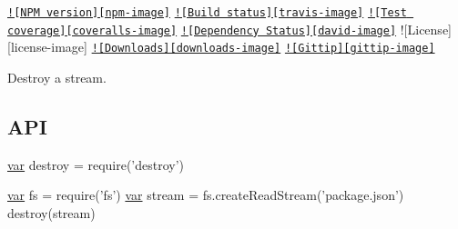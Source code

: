 \href{https://npmjs.org/package/destroy}{\tt !\mbox{[}N\+P\+M version\mbox{]}\mbox{[}npm-\/image\mbox{]}} \href{https://travis-ci.org/stream-utils/destroy}{\tt !\mbox{[}Build status\mbox{]}\mbox{[}travis-\/image\mbox{]}} \href{https://coveralls.io/r/stream-utils/destroy?branch=master}{\tt !\mbox{[}Test coverage\mbox{]}\mbox{[}coveralls-\/image\mbox{]}} \href{https://david-dm.org/stream-utils/destroy}{\tt !\mbox{[}Dependency Status\mbox{]}\mbox{[}david-\/image\mbox{]}} !\mbox{[}License\mbox{]}\mbox{[}license-\/image\mbox{]} \href{https://npmjs.org/package/destroy}{\tt !\mbox{[}Downloads\mbox{]}\mbox{[}downloads-\/image\mbox{]}} \href{https://www.gittip.com/jonathanong/}{\tt !\mbox{[}Gittip\mbox{]}\mbox{[}gittip-\/image\mbox{]}}

Destroy a stream.

\subsection*{A\+P\+I}


\begin{DoxyCode}
\hyperlink{018__def_8c_a335628f2e9085305224b4f9cc6e95ed5}{var} destroy = require(\textcolor{stringliteral}{'destroy'})

\hyperlink{018__def_8c_a335628f2e9085305224b4f9cc6e95ed5}{var} fs = require('fs')
\hyperlink{018__def_8c_a335628f2e9085305224b4f9cc6e95ed5}{var} stream = fs.createReadStream('package.json')
destroy(stream)
\end{DoxyCode}
 